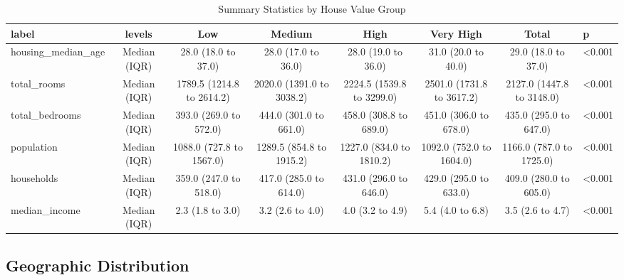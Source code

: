 \documentclass[
]{article}
\begin{document}
\begin{table}
\centering
\caption{\label{tab:unnamed-chunk-2}Summary Statistics by House Value Group}
\centering
\begin{tabular}[t]{l|c|c|c|c|c|c|l}
\hline
\textbf{label} & \textbf{levels} & \textbf{Low} & \textbf{Medium} & \textbf{High} & \textbf{Very High} & \textbf{Total} & \textbf{p}\\
\hline
housing\_median\_age & Median (IQR) & 28.0 (18.0 to 37.0) & 28.0 (17.0 to 36.0) & 28.0 (19.0 to 36.0) & 31.0 (20.0 to 40.0) & 29.0 (18.0 to 37.0) & <0.001\\
\hline
total\_rooms & Median (IQR) & 1789.5 (1214.8 to 2614.2) & 2020.0 (1391.0 to 3038.2) & 2224.5 (1539.8 to 3299.0) & 2501.0 (1731.8 to 3617.2) & 2127.0 (1447.8 to 3148.0) & <0.001\\
\hline
total\_bedrooms & Median (IQR) & 393.0 (269.0 to 572.0) & 444.0 (301.0 to 661.0) & 458.0 (308.8 to 689.0) & 451.0 (306.0 to 678.0) & 435.0 (295.0 to 647.0) & <0.001\\
\hline
population & Median (IQR) & 1088.0 (727.8 to 1567.0) & 1289.5 (854.8 to 1915.2) & 1227.0 (834.0 to 1810.2) & 1092.0 (752.0 to 1604.0) & 1166.0 (787.0 to 1725.0) & <0.001\\
\hline
households & Median (IQR) & 359.0 (247.0 to 518.0) & 417.0 (285.0 to 614.0) & 431.0 (296.0 to 646.0) & 429.0 (295.0 to 633.0) & 409.0 (280.0 to 605.0) & <0.001\\
\hline
median\_income & Median (IQR) & 2.3 (1.8 to 3.0) & 3.2 (2.6 to 4.0) & 4.0 (3.2 to 4.9) & 5.4 (4.0 to 6.8) & 3.5 (2.6 to 4.7) & <0.001\\
\hline
\end{tabular}
\end{table}

\subsection{Geographic Distribution}\label{geographic-distribution}
\end{document}
